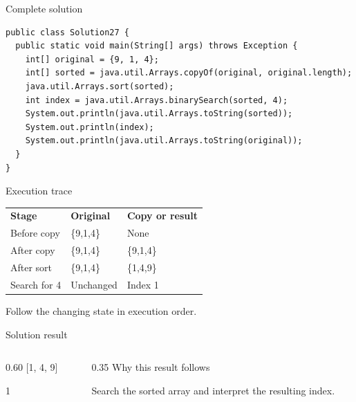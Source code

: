 \documentclass[10pt,aspectratio=169]{beamer}
\begin{document}
\begin{frame}[fragile,t]{Complete solution}
\begin{lstlisting}
public class Solution27 {
  public static void main(String[] args) throws Exception {
    int[] original = {9, 1, 4};
    int[] sorted = java.util.Arrays.copyOf(original, original.length);
    java.util.Arrays.sort(sorted);
    int index = java.util.Arrays.binarySearch(sorted, 4);
    System.out.println(java.util.Arrays.toString(sorted));
    System.out.println(index);
    System.out.println(java.util.Arrays.toString(original));
  }
}
\end{lstlisting}
\end{frame}

\begin{frame}[fragile,t]{Execution trace}
\small\renewcommand{\arraystretch}{1.5}
\begin{tabularx}{\textwidth}{>{\raggedright\arraybackslash}X>{\raggedright\arraybackslash}X>{\raggedright\arraybackslash}X}
\rowcolor{navy}
\color{white}\bfseries Stage & \color{white}\bfseries Original & \color{white}\bfseries Copy or result\\
Before copy & \{9,1,4\} & None\\
After copy & \{9,1,4\} & \{9,1,4\}\\
After sort & \{9,1,4\} & \{1,4,9\}\\
Search for 4 & Unchanged & Index 1\\
\end{tabularx}
\vspace{3mm}\footnotesize Follow the changing state in execution order.
\end{frame}

\begin{frame}[fragile,t]{Solution result}
\begin{columns}[T,onlytextwidth]\begin{column}{0.60\textwidth}
[1, 4, 9]\par 1\par [9, 1, 4]
\end{column}\begin{column}{0.35\textwidth}\small
Why this result follows

Search the sorted array and interpret the resulting index.
\end{column}\end{columns}
\end{frame}
\end{document}
